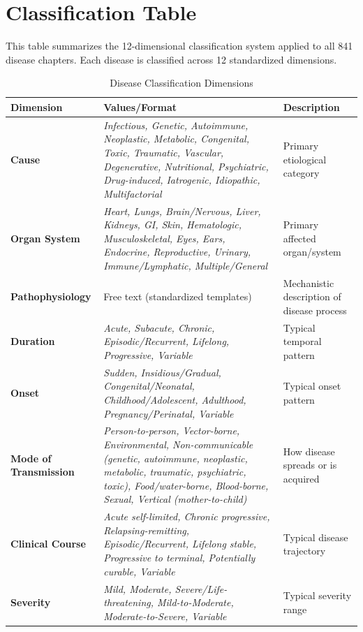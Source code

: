 \chapter{Classification Table}
\label{cha:classification_table}

This table summarizes the 12-dimensional classification system applied to all 841 disease chapters. Each disease is classified across 12 standardized dimensions.

\begin{table}[htbp]
\centering
\caption{Disease Classification Dimensions}
\label{tab:classification_dimensions}
\begin{tabular}{>{\bfseries}llp{8cm}}
\toprule
\textbf{Dimension} & \textbf{Values/Format} & \textbf{Description} \\
\midrule
Cause & \textit{Infectious, Genetic, Autoimmune, Neoplastic, Metabolic, Congenital, Toxic, Traumatic, Vascular, Degenerative, Nutritional, Psychiatric, Drug-induced, Iatrogenic, Idiopathic, Multifactorial} & Primary etiological category \\
Organ System & \textit{Heart, Lungs, Brain/Nervous, Liver, Kidneys, GI, Skin, Hematologic, Musculoskeletal, Eyes, Ears, Endocrine, Reproductive, Urinary, Immune/Lymphatic, Multiple/General} & Primary affected organ/system \\
Pathophysiology & Free text (standardized templates) & Mechanistic description of disease process \\
Duration & \textit{Acute, Subacute, Chronic, Episodic/Recurrent, Lifelong, Progressive, Variable} & Typical temporal pattern \\
Onset & \textit{Sudden, Insidious/Gradual, Congenital/Neonatal, Childhood/Adolescent, Adulthood, Pregnancy/Perinatal, Variable} & Typical onset pattern \\
Mode of Transmission & \textit{Person-to-person, Vector-borne, Environmental, Non-communicable (genetic, autoimmune, neoplastic, metabolic, traumatic, psychiatric, toxic), Food/water-borne, Blood-borne, Sexual, Vertical (mother-to-child)} & How disease spreads or is acquired \\
Clinical Course & \textit{Acute self-limited, Chronic progressive, Relapsing-remitting, Episodic/Recurrent, Lifelong stable, Progressive to terminal, Potentially curable, Variable} & Typical disease trajectory \\
Severity & \textit{Mild, Moderate, Severe/Life-threatening, Mild-to-Moderate, Moderate-to-Severe, Variable} & Typical severity range \\

\end{tabular}
\end{table}
